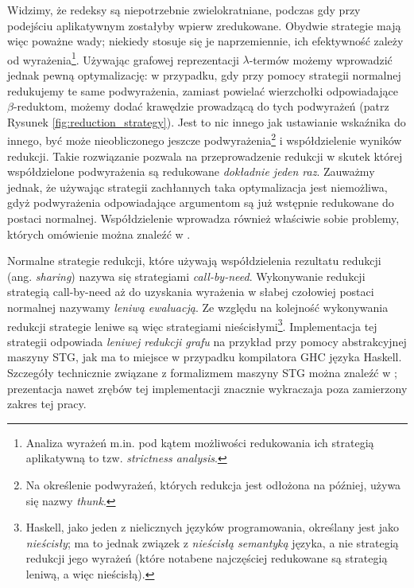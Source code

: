 Widzimy, że redeksy są niepotrzebnie zwielokratniane, podczas gdy przy podejściu aplikatywnym zostałyby wpierw zredukowane. Obydwie strategie mają więc poważne wady; niekiedy stosuje się je naprzemiennie, ich efektywność zależy od wyrażenia\footnote{Analiza wyrażeń m.in. pod kątem możliwości redukowania ich strategią aplikatywną to tzw. \emph{strictness analysis}.}. Używając grafowej reprezentacji \(\lambda\)-termów możemy wprowadzić jednak pewną optymalizację: w przypadku, gdy przy pomocy strategii normalnej redukujemy te same podwyrażenia, zamiast powielać wierzchołki odpowiadające \(\beta\)-reduktom, możemy dodać krawędzie prowadzącą do tych podwyrażeń (patrz Rysunek \ref{fig:reduction_strategy}). Jest to nic innego jak ustawianie wskaźnika do innego, być może nieobliczonego jeszcze podwyrażenia\footnote{Na określenie podwyrażeń, których redukcja jest odłożona na później, używa się nazwy \emph{thunk}.} i współdzielenie wyników redukcji. Takie rozwiązanie pozwala na przeprowadzenie redukcji w skutek której współdzielone podwyrażenia są redukowane \emph{dokładnie jeden raz}. Zauważmy jednak, że używając strategii zachłannych taka optymalizacja jest niemożliwa, gdyż podwyrażenia odpowiadające argumentom są już wstępnie redukowane do postaci normalnej. Współdzielenie wprowadza również właściwie sobie problemy, których omówienie można znaleźć w \cite[Rozdział 3.8.3]{parallel_graph_rewriting}.

Normalne strategie redukcji, które używają współdzielenia rezultatu redukcji (ang. \emph{sharing}) nazywa się strategiami \emph{call-by-need}. Wykonywanie redukcji strategią call-by-need aż do uzyskania wyrażenia w słabej czołowiej postaci normalnej nazywamy \emph{leniwą ewaluacją}. Ze względu na kolejność wykonywania redukcji strategie leniwe są więc strategiami nieścisłymi\footnote{Haskell, jako jeden z nielicznych języków programowania, określany jest jako \emph{nieścisły}; ma to jednak związek z \emph{nieścisłą semantyką} języka, a nie strategią redukcji jego wyrażeń (które notabene najczęściej redukowane są strategią leniwą, a więc nieścisłą).}. Implementacja tej strategii odpowiada \emph{leniwej redukcji grafu} \cite[Rozdział 12.1, str. 212]{PeytonJones:1987:IFP:1096899} na przykład przy pomocy abstrakcyjnej maszyny STG, jak ma to miejsce w przypadku kompilatora GHC języka Haskell. Szczegóły technicznie związane z formalizmem maszyny STG można znaleźć w \cite{jones1992implementing}; prezentacja nawet zrębów tej implementacji znacznie wykraczaja poza zamierzony zakres tej pracy. 

